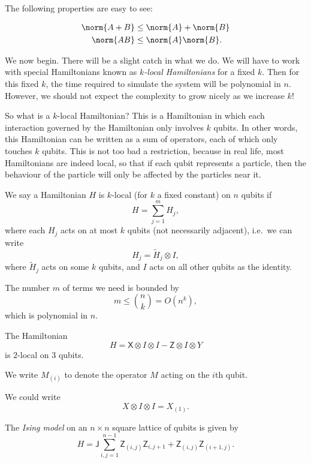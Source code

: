 \documentclass[a4paper]{article}
\newcommand{\qJ}{\mathsf{J}}
\newcommand{\qX}{\mathsf{X}}
\newcommand{\qZ}{\mathsf{Z}}
\begin{document}
The following properties are easy to see:
\begin{prop}
  \begin{align*}
    \norm{A + B} &\leq \norm{A} + \norm{B}\\
    \norm{AB} &\leq \norm{A}\norm{B}.
  \end{align*}
\end{prop}

We now begin. There will be a slight catch in what we do. We will have to work with special Hamiltonians known as \emph{$k$-local Hamiltonians} for a fixed $k$. Then for this fixed $k$, the time required to simulate the system will be polynomial in $n$. However, we should not expect the complexity to grow nicely as we increase $k$!

So what is a $k$-local Hamiltonian? This is a Hamiltonian in which each interaction governed by the Hamiltonian only involves $k$ qubits. In other words, this Hamiltonian can be written as a sum of operators, each of which only touches $k$ qubits. This is not too bad a restriction, because in real life, most Hamiltonians are indeed local, so that if each qubit represents a particle, then the behaviour of the particle will only be affected by the particles near it.

\begin{defi}
  We say a Hamiltonian $H$ is $k$-local (for $k$ a fixed constant) on $n$ qubits if
  \[
    H = \sum_{j = 1}^m H_j,
  \]
  where each $H_j$ acts on at most $k$ qubits (not necessarily adjacent), i.e.\ we can write
  \[
    H_j = \tilde{H}_j \otimes I,
  \]
  where $\tilde{H}_j$ acts on some $k$ qubits, and $I$ acts on all other qubits as the identity.
\end{defi}

The number $m$ of terms we need is bounded by
\[
  m \leq \binom{n}{k} = O(n^k),
\]
which is polynomial in $n$.

\begin{eg}
  The Hamiltonian
  \[
    H = \qX \otimes I \otimes I - \qZ \otimes I \otimes Y
  \]
  is $2$-local on $3$ qubits.
\end{eg}

We write $M_{(i)}$ to denote the operator $M$ acting on the $i$th qubit.
\begin{eg}
  We could write
  \[
    X \otimes I \otimes I = X_{(1)}.
  \]
\end{eg}

\begin{eg}
  The \emph{Ising model} on an $n \times n$ square lattice of qubits is given by
  \[
    H = \qJ \sum_{i, j = 1}^{n - 1} \qZ_{(i, j)} \qZ_{i, j + 1} + \qZ_{(i, j)} \qZ_{(i + 1, j)}.
  \]
\end{eg}
\end{document}
